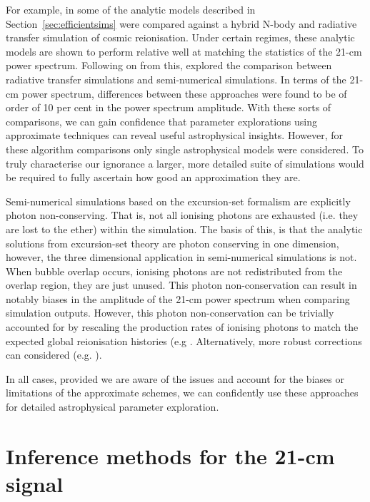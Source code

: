 For example, in \cite{Santos:2008} some of the analytic models described in Section~\ref{sec:efficientsims} were compared against a hybrid N-body and radiative transfer simulation of cosmic reionisation. Under certain regimes, these analytic models are shown to perform relative well at matching the statistics of the 21-cm power spectrum. Following on from this, \cite{Zahn:2011} explored the comparison between radiative transfer simulations and semi-numerical simulations. In terms of the 21-cm power spectrum, differences between these approaches were found to be of order of 10 per cent in the power spectrum amplitude. With these sorts of comparisons, we can gain confidence that parameter explorations using approximate techniques can reveal useful astrophysical insights. However, for these algorithm comparisons only single astrophysical models were considered. To truly characterise our ignorance a larger, more detailed suite of simulations would be required to fully ascertain how good an approximation they are.

Semi-numerical simulations based on the excursion-set formalism are explicitly photon non-conserving. That is, not all ionising photons are exhausted (i.e. they are lost to the ether) within the simulation. The basis of this, is that the analytic solutions from excursion-set theory are photon conserving in one dimension, however, the three dimensional application in semi-numerical simulations is not. When bubble overlap occurs, ionising photons are not redistributed from the overlap region, they are just unused. This photon non-conservation can result in notably biases in the amplitude of the 21-cm power spectrum \cite{Choudhury:2018} when comparing simulation outputs. However, this photon non-conservation can be trivially accounted for by rescaling the production rates of ionising photons to match the expected global reionisation histories (e.g \cite{Zahn:2011,Majumdar:2014}. Alternatively, more robust corrections can considered (e.g. \cite{Paranjape:2016,Choudhury:2018,Molaro:2019}).

In all cases, provided we are aware of the issues and account for the biases or limitations of the approximate schemes, we can confidently use these approaches for detailed astrophysical parameter exploration.

\section{Inference methods for the 21-cm signal}

